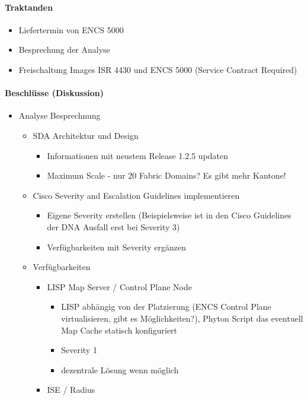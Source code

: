 \paragraph{Traktanden}
\begin{itemize}	
	\item Liefertermin von ENCS 5000
	\item Besprechung der Analyse
	\item Freischaltung Images ISR 4430 und ENCS 5000 (Service Contract Required)
\end{itemize}

\paragraph{Beschlüsse (Diskussion)}
\begin{itemize}
	\item Analyse Besprechnung
	\begin{itemize}
		\item SDA Architektur und Design
		\begin{itemize}
			\item Informationen mit neustem Release 1.2.5 updaten
			\item Maximum Scale - nur 20 Fabric Domains? Es gibt mehr Kantone!
		\end{itemize}
		\item Cisco Severity and Escalation Guidelines implementieren
		\begin{itemize}
			\item Eigene Severity erstellen (Beispielsweise ist in den Cisco Guidelines der DNA Ausfall erst bei Severity 3) 
			\item Verfügbarkeiten mit Severity ergänzen
		\end{itemize}
		\item Verfügbarkeiten
		\begin{itemize}
			\item LISP Map Server / Control Plane Node
			\begin{itemize}
				\item LISP abhängig von der Platzierung (ENCS Control Plane virtualisieren, gibt es Möglichkeiten?), Phyton Script das eventuell Map Cache statisch konfiguriert
				\item Severity 1
				\item dezentrale Lösung wenn möglich
			\end{itemize}
			\item ISE / Radius
			\begin{itemize}

\end{itemize}
\end{itemize}
\end{itemize}
\end{itemize}
